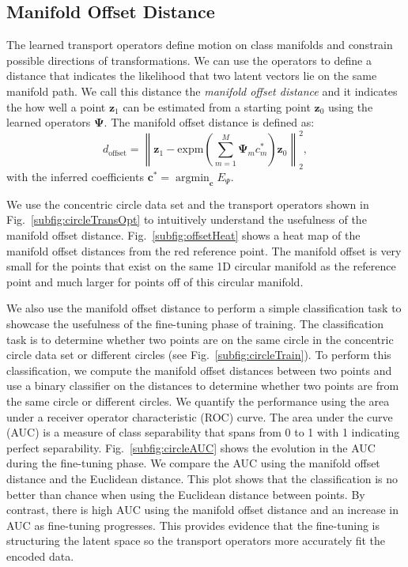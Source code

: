 \documentclass[letterpaper]{article} %
\newcommand{\mtx}[1]{\ensuremath{\mathbf{#1}}}
\newcommand{\vtr}[1]{\ensuremath{\mathbf{#1}}}
\newcommand{\argmin}{\mathop{\mathrm{argmin}}}
\begin{document}
\subsection{Manifold Offset Distance}\label{sec:distMet}
The learned transport operators define motion on class manifolds and constrain possible directions of transformations. We can use the operators to define a distance that indicates the likelihood that two latent vectors lie on the same manifold path. We call this distance the \textit{manifold offset distance} and it indicates the how well a point $\vtr{z}_1$ can be estimated from a starting point $\vtr{z}_0$ using the learned operators $\mtx{\Psi}$. The manifold offset distance is defined as:
\begin{equation}
d_{\mbox{offset}} = \left\|\vtr{z}_1 - \mathrm{expm}\left(\sum_{m=1}^M{\mtx{\Psi}_mc^*_{m}}\right)\vtr{z}_0\right\|_2^2,
\end{equation}
with the inferred coefficients $\vtr{c}^* =  \argmin_\vtr{c}E_{\Psi}$.

We use the concentric circle data set and the transport operators shown in Fig.~\ref{subfig:circleTransOpt} to intuitively understand the usefulness of the manifold offset distance. Fig.~\ref{subfig:offsetHeat} shows a heat map of the manifold offset distances from the red reference point. The manifold offset is very small for the points that exist on the same 1D circular manifold as the reference point and much larger for points off of this circular manifold.


We also use the manifold offset distance to perform a simple classification task to showcase the usefulness of the fine-tuning phase of training. The classification task is to determine whether two points are on the same circle in the concentric circle data set or different circles (see Fig.~\ref{subfig:circleTrain}). To perform this classification, we compute the manifold offset distances between two points and use a binary classifier on the distances to determine whether two points are from the same circle or different circles. We quantify the performance using the area under a receiver operator characteristic (ROC) curve. The area under the curve (AUC) is a measure of class separability that spans from 0 to 1 with 1 indicating perfect separability. Fig.~\ref{subfig:circleAUC} shows the evolution in the AUC during the fine-tuning phase. We compare the AUC using the manifold offset distance and the Euclidean distance. This plot shows that the classification is no better than chance when using the Euclidean distance between points. By contrast, there is high AUC using the manifold offset distance and an increase in AUC as fine-tuning progresses. This provides evidence that the fine-tuning is structuring the latent space so the transport operators more accurately fit the encoded data.
\end{document}
